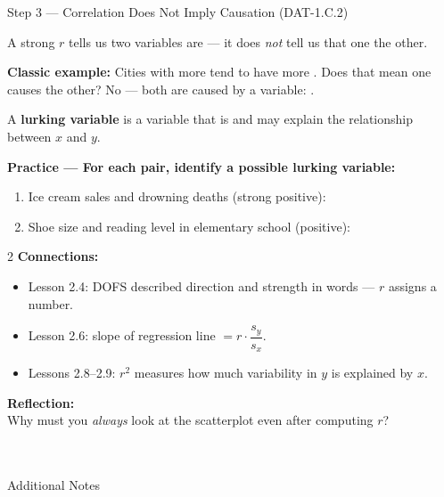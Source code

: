\documentclass[10pt]{article}
\begin{document}
\begin{notesbox}{Step 3 --- Correlation Does Not Imply Causation (DAT-1.C.2)}
\small

\noindent A strong $r$ tells us two variables are \blank{3cm} --- it does \emph{not} tell
us that one \blank{3cm} the other.

\vspace{6pt}
\textbf{Classic example:} Cities with more \blank{4cm} tend to have more \blank{4cm}.
Does that mean one causes the other? No --- both are caused by a \blank{3.5cm} variable: \blank{4cm}.

\vspace{6pt}
A \textbf{lurking variable} is a variable that is \blank{5cm} and may explain the
relationship between $x$ and $y$.

\vspace{6pt}
\textbf{Practice --- For each pair, identify a possible lurking variable:}
\begin{enumerate}[leftmargin=1.5em, itemsep=4pt]
  \item Ice cream sales and drowning deaths (strong positive): \blank{6cm}
  \item Shoe size and reading level in elementary school (positive): \blank{6cm}
\end{enumerate}
\end{notesbox}

\vspace{0.08in}

\begin{spiralbox}
\small
\begin{multicols}{2}
\textbf{Connections:}
\begin{itemize}[itemsep=3pt]
  \item Lesson 2.4: DOFS described direction and strength in words --- $r$ assigns a number.
  \item Lesson 2.6: slope of regression line $= r \cdot \dfrac{s_y}{s_x}$.
  \item Lessons 2.8--2.9: $r^2$ measures how much variability in $y$ is explained by $x$.
\end{itemize}

\columnbreak

\textbf{Reflection:}\\
Why must you \emph{always} look at the scatterplot even after computing $r$?\\[2pt]
\writeline\\[1pt]\writeline\\[1pt]\writeline
\end{multicols}
\end{spiralbox}

\vspace{0.08in}

\begin{notesbox}{Additional Notes}
\vspace{0pt}
\writeline\\\writeline\\\writeline\\\writeline\\\writeline
\end{notesbox}
\end{document}
